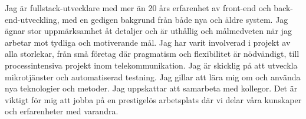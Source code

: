 \documentclass{cv-stylish}
\begin{document}
\begin{center} %



\vspace{1.0cm} %



\begin{adjustwidth}{1cm}{1cm}


Jag är fullstack-utvecklare med mer än 20 års erfarenhet av
front-end och back-end-utveckling, med en gedigen bakgrund
från både nya och äldre system. Jag ägnar stor uppmärksamhet åt
detaljer och är uthållig och målmedveten när jag arbetar mot
tydliga och motiverande mål. Jag har varit involverad i projekt av
alla storlekar, från små företag där pragmatism och flexibilitet
är nödvändigt, till processintensiva projekt inom telekommunikation.
Jag är skicklig på att utveckla mikrotjänster och automatiserad
testning. Jag gillar att lära mig om och använda nya teknologier
och metoder. Jag uppskattar att samarbeta med kollegor. Det är
viktigt för mig att jobba på en prestigelös arbetsplats där vi delar
våra kunskaper och erfarenheter med varandra.




\end{adjustwidth}
\end{center}
\end{document}
